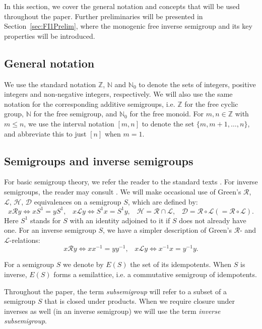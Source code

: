\documentclass[reqno]{amsart}
\theoremstyle{plain}
\theoremstyle{definition}
\numberwithin{equation}{section}
\begin{document}
In this section, we cover the general notation and concepts that will be used throughout the paper. 
Further preliminaries will be presented in Section~\ref{sec:FI1Prelim}, where the monogenic free inverse semigroup and its key properties will be introduced.

\subsection{General notation} 
We use the standard notation  $\mathbb{Z}$, $\mathbb{N}$ and $\mathbb{N}_0$ to denote the sets of integers, positive integers and non-negative integers, respectively. 
We will also use the same notation for the corresponding additive semigroups, i.e. $\mathbb{Z}$ for the free cyclic group, $\mathbb{N}$ for the free semigroup, and $\mathbb{N}_0$ for the free monoid.
For $m,n\in\mathbb{Z}$ with $m\leq n$, we use the interval notation $[m,n]$ to denote the set $\{m, m+1, \dots, n\}$, and abbreviate this to just $[n]$ when $m=1$. 

\subsection{Semigroups and inverse semigroups}
For basic semigroup theory, we refer the reader to the standard texts \cite{CliffordPreston1, Howie}. For inverse semigroups, the reader may consult \cite{Lawson, Petrich}.
We will make occasional use of Green's $\mathscr{R}$, $\mathscr{L}$, $\mathscr{H}$, $\mathscr{D}$ equivalences on a semigroup $S$, which are defined by:
\[
x\mathscr{R}y \Leftrightarrow xS^1=yS^1,\;\;\; x\mathscr{L}y \Leftrightarrow S^1x=S^1y,\;\;\; 
\mathscr{H}=\mathscr{R}\cap\mathscr{L},\;\;\; 
\mathscr{D}=\mathscr{R}\circ\mathscr{L}(=\mathscr{R}\circ\mathscr{L}).
\]
Here $S^1$ stands for $S$ with an identity adjoined to it if $S$ does not already have one. For an inverse semigroup $S$, we have a simpler description of Green's $\mathscr{R}$- and $\mathscr{L}$-relations: 
\[
x\mathscr{R}y \Leftrightarrow xx^{-1} =  yy^{-1}, \;\;\; x\mathscr{L}y \Leftrightarrow x^{-1}x = y^{-1}y. 
\]


For a semigroup $S$ we denote by $E(S)$ the set of its idempotents. When $S$ is inverse, $E(S)$ forms a semilattice, i.e. a commutative semigroup of idempotents.

Throughout the paper, the term \emph{subsemigroup} will refer to a subset of a semigroup $S$ that is closed under products. When we require closure under inverses as well (in an inverse semigroup) we will use the term \emph{inverse subsemigroup}. 
\end{document}
